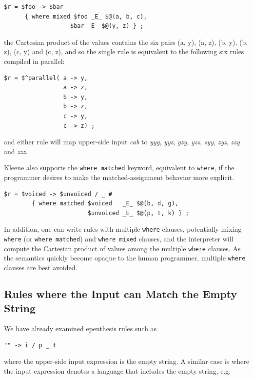 \begin{Verbatim}
$r = $foo -> $bar 
      { where mixed $foo _E_ $@(a, b, c), 
	               $bar _E_ $@(y, z) } ;
\end{Verbatim}

\noindent
the Cartesian product of the values contains the six pairs (a, y), (a, z), (b, y), (b, z), (c, y) and (c, z), and so
the single rule is equivalent to the following six rules compiled in parallel:

\begin{Verbatim}
$r = $^parallel( a -> y, 
                 a -> z, 
                 b -> y, 
                 b -> z, 
                 c -> y, 
                 c -> z) ;
\end{Verbatim}

\noindent
and either rule will map upper-side input \emph{cab} to \emph{yyy}, \emph{yyz}, \emph{yzy}, \emph{yzz}, \emph{zyy}, \emph{zyz},
\emph{zzy} and \emph{zzz}.


Kleene also supports the \texttt{where matched} keyword, equivalent to \texttt{where}, if the
programmer desires to make the matched-assignment behavior more explicit.

\begin{Verbatim}
$r = $voiced -> $unvoiced / _ #
        { where matched $voiced   _E_ $@(b, d, g), 
                        $unvoiced _E_ $@(p, t, k) } ;
\end{Verbatim}

\noindent
In addition, one can write rules with multiple \texttt{where}-clauses, potentially mixing \texttt{where} (or
\texttt{where matched}) and \texttt{where mixed} clauses, and the interpreter will compute the Cartesian product of values
among the multiple \texttt{where} clauses.  As the semantics quickly become opaque to the human programmer, multiple
\texttt{where} clauses are best avoided.

\subsection{Rules where the Input can Match the Empty String}

We have already examined epenthesis rules such as

\begin{Verbatim}
"" -> i / p _ t
\end{Verbatim}

\noindent
where the upper-side input expression is the empty string.  A similar case is where the input expression denotes a
language that includes the empty string, e.g.

